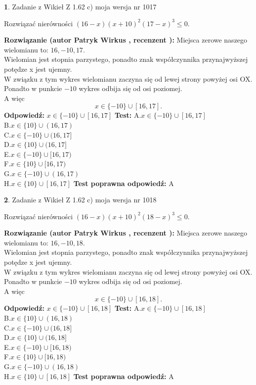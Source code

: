 \documentclass[12pt, a4paper]{article}
\theoremstyle{definition} %
\newtheorem{zad}{}
\newcommand{\zadStart}[1]{\begin{zad}#1\newline}
\newcommand{\zadStop}{\end{zad}}
\newcommand{\rozwStart}[2]{\noindent \textbf{Rozwiązanie (autor #1 , recenzent #2): }\newline}
\newcommand{\rozwStop}{\newline}
\newcommand{\odpStart}{\noindent \textbf{Odpowiedź:}\newline}
\newcommand{\odpStop}{\newline}
\newcommand{\testStart}{\noindent \textbf{Test:}\newline}
\newcommand{\testStop}{\newline}
\newcommand{\kluczStart}{\noindent \textbf{Test poprawna odpowiedź:}\newline}
\newcommand{\kluczStop}{\newline}
\begin{document}
\zadStart{Zadanie z Wikieł Z 1.62 c) moja wersja nr 1017}

Rozwiązać nierówności $(16-x)(x+10)^{2}(17-x)^{3}\le0$.
\zadStop
\rozwStart{Patryk Wirkus}{}
Miejsca zerowe naszego wielomianu to: $16, -10, 17$.\\
Wielomian jest stopnia parzystego, ponadto znak współczynnika przy\linebreak najwyższej potędze x jest ujemny.\\ W związku z tym wykres wielomianu zaczyna się od lewej strony powyżej osi OX.\\
Ponadto w punkcie $-10$ wykres odbija się od osi poziomej.\\
A więc $$x \in \{-10\} \cup [16,17].$$
\rozwStop
\odpStart
$x \in \{-10\} \cup [16,17]$
\odpStop
\testStart
A.$x \in \{-10\} \cup [16,17]$\\
B.$x \in \{10\} \cup (16,17)$\\
C.$x \in \{-10\} \cup (16,17]$\\
D.$x \in \{10\} \cup (16,17]$\\
E.$x \in \{-10\} \cup [16,17)$\\
F.$x \in \{10\} \cup [16,17)$\\
G.$x \in \{-10\} \cup (16,17)$\\
H.$x \in \{10\} \cup [16,17]$
\testStop
\kluczStart
A
\kluczStop



\zadStart{Zadanie z Wikieł Z 1.62 c) moja wersja nr 1018}

Rozwiązać nierówności $(16-x)(x+10)^{2}(18-x)^{3}\le0$.
\zadStop
\rozwStart{Patryk Wirkus}{}
Miejsca zerowe naszego wielomianu to: $16, -10, 18$.\\
Wielomian jest stopnia parzystego, ponadto znak współczynnika przy\linebreak najwyższej potędze x jest ujemny.\\ W związku z tym wykres wielomianu zaczyna się od lewej strony powyżej osi OX.\\
Ponadto w punkcie $-10$ wykres odbija się od osi poziomej.\\
A więc $$x \in \{-10\} \cup [16,18].$$
\rozwStop
\odpStart
$x \in \{-10\} \cup [16,18]$
\odpStop
\testStart
A.$x \in \{-10\} \cup [16,18]$\\
B.$x \in \{10\} \cup (16,18)$\\
C.$x \in \{-10\} \cup (16,18]$\\
D.$x \in \{10\} \cup (16,18]$\\
E.$x \in \{-10\} \cup [16,18)$\\
F.$x \in \{10\} \cup [16,18)$\\
G.$x \in \{-10\} \cup (16,18)$\\
H.$x \in \{10\} \cup [16,18]$
\testStop
\kluczStart
A
\kluczStop
\end{document}
